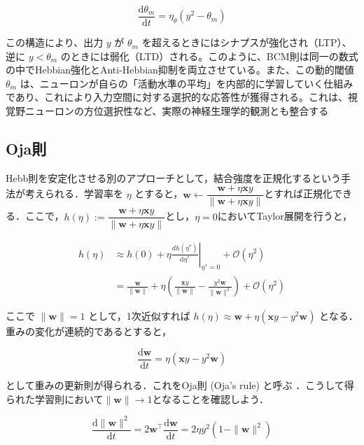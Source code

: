 \documentclass[titlepage]{ltjsbook}
\begin{document}
\begin{equation}
\frac{\mathrm{d}\theta_m}{\mathrm{d}t} = \eta_\theta (y^2 - \theta_m)
\end{equation}

この構造により、出力 $y$ が $\theta_m$ を超えるときにはシナプスが強化され（LTP）、逆に $y < \theta_m$ のときには弱化（LTD）される。このように、BCM則は同一の数式の中でHebbian強化とAnti-Hebbian抑制を両立させている。また、この動的閾値 $\theta_m$ は、ニューロンが自らの「活動水準の平均」を内部的に学習していく仕組みであり、これにより入力空間に対する選択的な応答性が獲得される。これは、視覚野ニューロンの方位選択性など、実際の神経生理学的観測とも整合する

\subsection{Oja則}
Hebb則を安定化させる別のアプローチとして，結合強度を正規化するという手法が考えられる．学習率を $\eta$ とすると，$\mathbf{w}\leftarrow\dfrac{\mathbf{w}+\eta \mathbf{x}y}{\|\mathbf{w}+\eta \mathbf{x}y\|}$とすれば正規化できる．ここで，$h(\eta):=\dfrac{\mathbf{w}+\eta \mathbf{x}y}{\|\mathbf{w}+\eta \mathbf{x}y\|}$とし，$\eta=0$においてTaylor展開を行うと，

\begin{align}
h(\eta)&\approx h(0) + \eta \left.\frac{dh(\eta^*)}{\mathrm{d}\eta^*}\right|_{\eta^*=0} + \mathcal{O}(\eta^2)\\
&=\frac{\mathbf{w}}{\|\mathbf{w}\|} + \eta \left(\frac{\mathbf{x}y}{\|\mathbf{w}\|}-\frac{y^2\mathbf{w}}{\|\mathbf{w}\|^3}\right)+ \mathcal{O}(\eta^2)
\end{align}

ここで $\|\mathbf{w}\|=1$ として，1次近似すれば $h(\eta)\approx \mathbf{w} + \eta \left(\mathbf{x}y-y^2 \mathbf{w}\right)$ となる．重みの変化が連続的であるとすると，

\begin{equation}
\frac{\mathrm{d}\mathbf{w}}{\mathrm{d}t} = \eta \left(\mathbf{x}y-y^2 \mathbf{w}\right)
\end{equation}

として重みの更新則が得られる．これをOja則 (Oja's rule) と呼ぶ \citep{Oja1982-yd}．こうして得られた学習則において$\|\mathbf{w}\|\to 1$となることを確認しよう．

\begin{equation}
\frac{\mathrm{d}\|\mathbf{w}\|^2}{\mathrm{d}t}=2\mathbf{w}^\top\frac{\mathrm{d}\mathbf{w}}{\mathrm{d}t}= 2\eta y^2\left(1-\|\mathbf{w}\|^2\right)
\end{equation}
\end{document}
